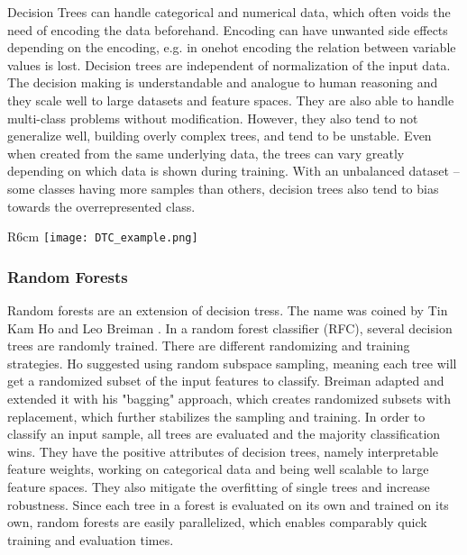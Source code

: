 Decision Trees can handle categorical and numerical data, which often voids the need of encoding the data beforehand. Encoding can have unwanted side effects depending on the encoding, e.g. in onehot encoding the relation between variable values is lost. Decision trees are independent of normalization of the input data. The decision making is understandable and analogue to human reasoning and they scale well to large datasets and feature spaces. They are also able to handle multi-class problems without modification. However, they also tend to not generalize well, building overly complex trees, and tend to be unstable. Even when created from the same underlying data, the trees can vary greatly depending on which data is shown during training. With an unbalanced dataset -- some classes having more samples than others, decision trees also tend to bias towards the overrepresented class.\\
\begin{wrapfigure}{R}{6cm}
    \centering
    \texttt{[image: DTC\_example.png]}
    \label{fig:dtc}
\end{wrapfigure}
\FloatBarrier

\subsubsection{Random Forests}
\label{sec:rfc}
Random forests are an extension of decision tress. The name was coined by Tin Kam Ho \cite{Ho.1995}\cite{Ho.1998} and Leo Breiman \cite{Breiman.2001}. In a random forest classifier (RFC), several decision trees are randomly trained. There are different randomizing and training strategies. Ho suggested using random subspace sampling, meaning each tree will get a randomized subset of the input features to classify. Breiman adapted and extended it with his "bagging" approach, which creates randomized subsets with replacement, which further stabilizes the sampling and training. In order to classify an input sample, all trees are evaluated and the majority classification wins. They have the positive attributes of decision trees, namely interpretable feature weights, working on categorical data and being well scalable to large feature spaces. They also mitigate the overfitting of single trees and increase robustness. Since each tree in a forest is evaluated on its own and trained on its own, random forests are easily parallelized, which enables comparably quick training and evaluation times.

